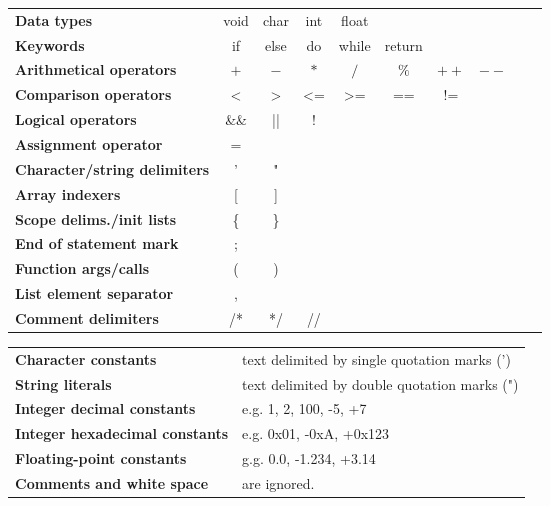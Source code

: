 \documentclass[12pt]{article}
\begin{document}
\begin{tabular}{lccccccccc}
\textbf{Data types}                      & void & char & int & float &         &      &      &   &   \\
\textbf{Keywords}                        & if   & else & do  & while & return  &      &      &   &   \\
\textbf{Arithmetical operators}          & $+$  & $-$  & $*$ & $/$   & $\%$    & $++$ & $--$ &   &   \\
\textbf{Comparison operators}            & <    & >    & <=  & >=    & ==      & !=   &      &   &   \\
\textbf{Logical operators}               & \&\& & ||   & !   &       &         &      &      &   &   \\
\textbf{Assignment operator}             & =    &      &     &       &         &      &      &   &   \\
\textbf{Character/string delimiters}     & '    & "    &     &       &         &      &      &   &   \\
\textbf{Array indexers}                  & [    & ]    &     &       &         &      &      &   &   \\
\textbf{Scope delims./init lists}        & \{   & \}   &     &       &         &      &      &   &   \\
\textbf{End of statement mark}           & ;    &      &     &       &         &      &      &   &   \\
\textbf{Function args/calls}             & (    & )    &     &       &         &      &      &   &   \\
\textbf{List element separator}          & ,    &      &     &       &         &      &      &   &   \\
\textbf{Comment delimiters}              & /*   & */   & //  &       &         &      &      &   &   \\
\end{tabular}

\vspace*{1cm}

\begin{tabular}{ll}
\textbf{Character constants}            & text delimited by single quotation marks (') \\
\textbf{String literals}                & text delimited by double quotation marks (") \\
\textbf{Integer decimal constants}      & e.g. 1, 2, 100, -5, +7                       \\
\textbf{Integer hexadecimal constants}  & e.g. 0x01, -0xA, +0x123                      \\
\textbf{Floating-point constants}       & g.g. 0.0, -1.234, +3.14                      \\
\textbf{Comments and white space}       & are ignored.                                 \\
\end{tabular}
\end{document}
